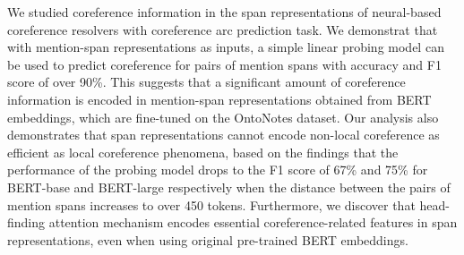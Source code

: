 \documentclass[11pt]{article}
\begin{document}
\begin{itemize}
 

\end{itemize}


We studied coreference information in the span representations of neural-based coreference resolvers with coreference arc prediction task. We demonstrat that with mention-span representations as inputs, a simple linear probing model can be used to predict coreference for pairs of mention spans with accuracy and F1 score of over 90\%. This suggests that a significant amount of coreference information is encoded in mention-span representations obtained from BERT embeddings, which are fine-tuned on the OntoNotes dataset. Our analysis also demonstrates that span representations cannot encode non-local coreference as efficient as local coreference phenomena, based on the findings that the performance of the probing model drops to the F1 score of 67\% and 75\% for BERT-base and BERT-large respectively when the distance between the pairs of mention spans increases to over 450 tokens. Furthermore, we discover that head-finding attention mechanism encodes essential coreference-related features in span representations, even when using original pre-trained BERT embeddings.
\end{document}
